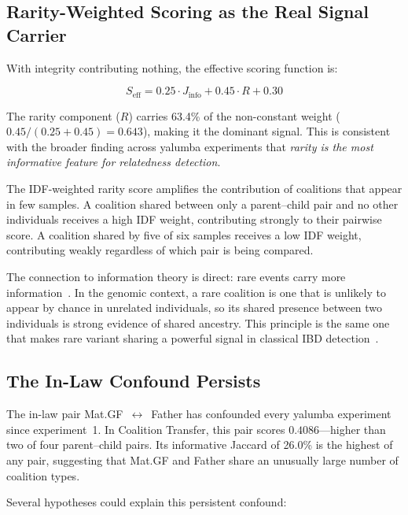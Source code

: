 \documentclass{../yalumba}
\begin{document}
\subsection{Rarity-Weighted Scoring as the Real Signal Carrier}
\label{sec:discussion-rarity}

With integrity contributing nothing, the effective scoring function is:

\[
  S_{\mathrm{eff}} = 0.25 \cdot J_{\mathrm{info}} + 0.45 \cdot R + 0.30
\]

The rarity component ($R$) carries 63.4\% of the non-constant weight
($0.45 / (0.25 + 0.45) = 0.643$), making it the dominant signal.  This is
consistent with the broader finding across yalumba experiments that
\emph{rarity is the most informative feature for relatedness detection}.

The IDF-weighted rarity score amplifies the contribution of coalitions that
appear in few samples.  A coalition shared between only a parent--child pair
and no other individuals receives a high IDF weight, contributing strongly
to their pairwise score.  A coalition shared by five of six samples receives
a low IDF weight, contributing weakly regardless of which pair is being
compared.

The connection to information theory is direct: rare events carry more
information~\cite{li2004ncd}.  In the genomic context, a rare coalition is
one that is unlikely to appear by chance in unrelated individuals, so its
shared presence between two individuals is strong evidence of shared ancestry.
This principle is the same one that makes rare variant sharing a powerful
signal in classical IBD detection~\cite{browning2012ibd}.

\subsection{The In-Law Confound Persists}
\label{sec:discussion-inlaw}

The in-law pair Mat.GF~$\leftrightarrow$~Father has confounded every yalumba
experiment since experiment~1.  In Coalition Transfer, this pair scores
$0.4086$---higher than two of four parent--child pairs.  Its informative
Jaccard of 26.0\% is the highest of any pair, suggesting that Mat.GF and
Father share an unusually large number of coalition types.

Several hypotheses could explain this persistent confound:
\end{document}
